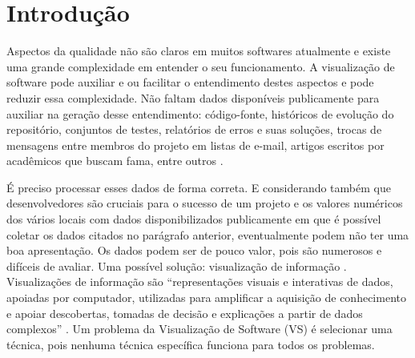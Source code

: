 \chapter{Introdução}


Aspectos da qualidade não são claros em muitos softwares atualmente e existe
uma grande complexidade em entender o seu funcionamento. A visualização de
software pode auxiliar e ou facilitar o entendimento destes aspectos e pode
reduzir essa complexidade. Não faltam dados disponíveis publicamente para
auxiliar na geração desse entendimento: código-fonte, históricos de evolução do
repositório, conjuntos de testes, relatórios de erros e suas soluções, trocas
de mensagens entre membros do projeto em listas de e-mail, artigos escritos por
acadêmicos que buscam fama, entre outros \cite{messias2012}
\cite{benkler2006wealth}.


É preciso processar esses dados de forma correta. E considerando também que
desenvolvedores são cruciais para o sucesso de um projeto e os valores
numéricos dos vários locais com dados disponibilizados publicamente em que é
possível coletar os dados citados no parágrafo anterior, eventualmente podem não ter
uma boa apresentação. Os dados podem ser de pouco valor, pois são numerosos e
difíceis de avaliar. Uma possível solução: visualização de informação
\cite{messias2012}. Visualizações de informação são ``representações visuais e
interativas de dados, apoiadas por computador, utilizadas para amplificar a
aquisição de conhecimento e apoiar descobertas, tomadas de decisão e
explicações a partir de dados complexos'' \cite{card1999readings}. Um problema
da Visualização de Software (VS) é selecionar uma técnica, pois nenhuma técnica
específica funciona para todos os problemas.



